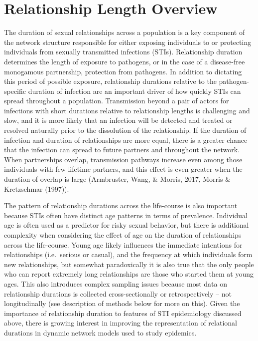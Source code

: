 \documentclass [11pt, proquest] {uwthesis}[2015/03/03]
\begin{document}
\section{Relationship Length
Overview}\label{relationship-length-overview}

The duration of sexual relationships across a population is a key
component of the network structure responsible for either exposing
individuals to or protecting individuals from sexually transmitted
infections (STIs). Relationship duration determines the length of
exposure to pathogens, or in the case of a disease-free monogamous
partnership, protection from pathogens. In addition to dictating this
period of possible exposure, relationship durations relative to the
pathogen-specific duration of infection are an important driver of how
quickly STIs can spread throughout a population. Transmission beyond a
pair of actors for infections with short durations relative to
relationship lengths is challenging and slow, and it is more likely that
an infection will be detected and treated or resolved naturally prior to
the dissolution of the relationship. If the duration of infection and
duration of relationships are more equal, there is a greater chance that
the infection can spread to future partners and throughout the network.
When partnerships overlap, transmission pathways increase even among
those individuals with few lifetime partners, and this effect is even
greater when the duration of overlap is large (Armbruster, Wang, \&
Morris, 2017, Morris \& Kretzschmar (1997)).

The pattern of relationship durations across the life-course is also
important because STIs often have distinct age patterns in terms of
prevalence. Individual age is often used as a predictor for risky sexual
behavior, but there is additional complexity when considering the effect
of age on the duration of relationships across the life-course. Young
age likely influences the immediate intentions for relationships
(i.e.~serious or casual), and the frequency at which individuals form
new relationships, but somewhat paradoxically it is also true that the
only people who can report extremely long relationships are those who
started them at young ages. This also introduces complex sampling issues
because most data on relationship durations is collected
cross-sectionally or retrospectively -- not longitudinally (see
description of methods below for more on this). Given the importance of
relationship duration to features of STI epidemiology discussed above,
there is growing interest in improving the representation of relational
durations in dynamic network models used to study epidemics.
\end{document}
